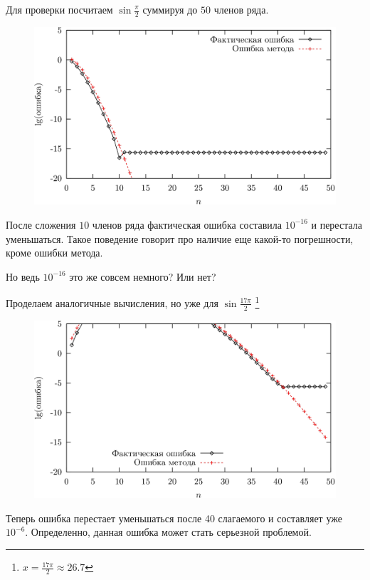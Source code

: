 \documentclass[professionalfonts,compress,unicode]{beamer}
\begin{document}
{
	Для проверки посчитаем $\sin \frac{\pi}{2}$ суммируя до $50$ членов ряда. 
	
	\begin{figure}%
	\center
	\includegraphics[height=0.5\textheight]{sine_pi_2}
	\end{figure}
	
	После сложения $10$ членов ряда фактическая ошибка составила $10^{-16}$ и перестала уменьшаться. 
	Такое поведение говорит про наличие еще какой-то погрешности, кроме ошибки метода. 
	\begin{block}{}
	Но ведь $10^{-16}$ это же совсем немного? Или нет?
	\end{block}
}

{
	Проделаем аналогичные вычисления, но уже для $\sin \frac{17\pi}{2}$
	\footnote{$x = \frac{17\pi}{2} \approx 26.7$}
	
	\begin{figure}%
	\center
	\includegraphics[height=0.5\textheight]{sine_17pi_2}
	\end{figure}
	
	Теперь ошибка перестает уменьшаться после 40 слагаемого и составляет уже $10^{-6}$.
	Определенно, данная ошибка может стать серьезной проблемой.
}
\end{document}
